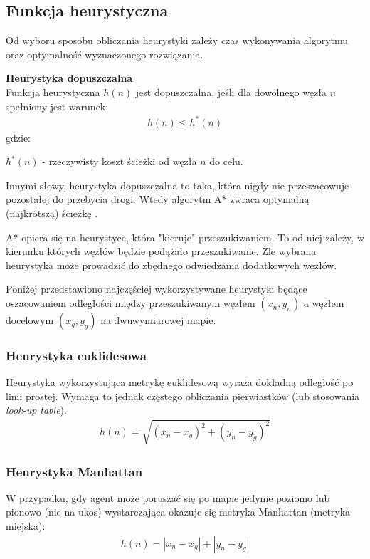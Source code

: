 \subsection{Funkcja heurystyczna}
\label{ch:astar_heurystyki}
Od wyboru sposobu obliczania heurystyki zależy czas wykonywania algorytmu oraz optymalność wyznaczonego rozwiązania.

\begin{definition}{\bf Heurystyka dopuszczalna\\}
	Funkcja heurystyczna $h(n)$ jest dopuszczalna, jeśli dla dowolnego węzła $n$ spełniony jest warunek:
\begin{gather}
 	h(n) \leq h^*(n)
 	\label{eq_astar_heurystyka_admissible} 
\end{gather}
 gdzie:

 $h^*(n)$ - rzeczywisty koszt ścieżki od węzła $n$ do celu.
\end{definition}

Innymi słowy, heurystyka dopuszczalna to taka, która nigdy nie przeszacowuje pozostałej do przebycia drogi. Wtedy algorytm A* zwraca optymalną (najkrótszą) ścieżkę \cite{cooppath}.

A* opiera się na heurystyce, która "kieruje" przeszukiwaniem.
To od niej zależy, w kierunku których węzłów będzie podążało przeszukiwanie.
Źle wybrana heurystyka może prowadzić do zbędnego odwiedzania dodatkowych węzłów.

Poniżej przedstawiono najczęściej wykorzystywane heurystyki będące oszacowaniem odległości między przeszukiwanym węzłem $(x_n, y_n)$ a węzłem docelowym $(x_g, y_g)$ na dwuwymiarowej mapie.

\subsubsection{Heurystyka euklidesowa}
Heurystyka wykorzystująca metrykę euklidesową wyraża dokładną odległość po linii prostej. Wymaga to jednak częstego obliczania pierwiastków (lub stosowania {\it look-up table}).
\begin{gather}
 	h(n) = \sqrt{(x_n - x_g)^2 + (y_n - y_g)^2}
 	\label{eq_astar_heu_euc} 
\end{gather}

\subsubsection{Heurystyka Manhattan}
W przypadku, gdy agent może poruszać się po mapie jedynie poziomo lub pionowo (nie na ukos) wystarczająca okazuje się metryka Manhattan (metryka miejska):
\begin{gather}
 	h(n) = |x_n - x_g| + |y_n - y_g|
 	\label{eq_astar_heu_man} 
\end{gather}

